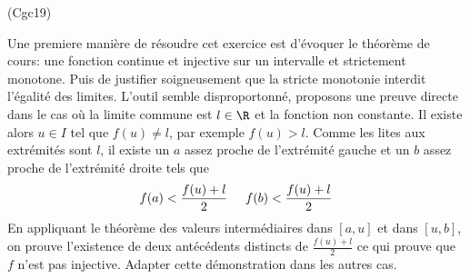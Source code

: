 \begin{tiny}(Cgc19)\end{tiny} Une premiere manière de résoudre cet exercice est d'évoquer le théorème de cours: une fonction continue et injective sur un intervalle et strictement monotone. Puis de justifier soigneusement que la stricte monotonie interdit l'égalité des limites.\newline
L'outil semble disproportonné, proposons une preuve directe dans le cas où la limite commune est $l\in \R$ et la fonction non constante.\newline
Il existe alors $u\in I$ tel que $f(u)\neq l$, par exemple $f(u)>l$. Comme les lites aux extrémités sont $l$, il existe un $a$ assez proche de l'extrémité gauche et un $b$ assez proche de l'extrémité droite tels que 
\begin{displaymath}
  f(a) < \frac{f(u)+l}{2}\hspace{0.5cm} f(b) < \frac{f(u)+l}{2}
\end{displaymath}
En appliquant le théorème des valeurs intermédiaires dans $[a,u]$ et dans $[u,b]$, on prouve l'existence de deux antécédents distincts de $\frac{f(u) + l}{2}$ ce qui prouve que $f$ n'est pas injective.\newline
Adapter cette démonstration dans les autres cas.
